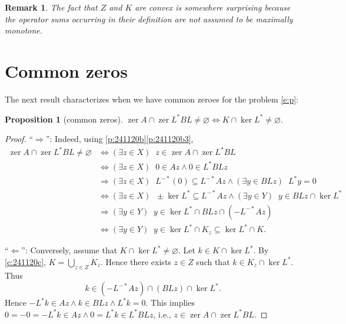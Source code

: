 \documentclass{article}
\providecommand{\siff}{\Leftrightarrow}
\newcommand{\zer}{\ensuremath{\operatorname{zer}}}
\newtheorem{proposition}[theorem]{Proposition}
\newtheorem{remark}[theorem]{Remark}
\begin{document}
\begin{remark} 
\label{r:241211a}
The fact that $Z$ and $K$ are convex is somewhere surprising 
because the operator sums occurring in their definition are 
not assumed to be maximally monotone.
\end{remark}


\section{Common zeros}

\label{s:commonzeros}



The next result characterizes when we have common zeroes for the problem 
\cref{e:p}:


\begin{proposition}[common zeros]\label{prop:commonzeros}
$\zer A\cap \zer L^*BL\neq \varnothing \siff K\cap \ker L^* \neq \varnothing$. 
\end{proposition}
\begin{proof} 
``$\Rightarrow$'':
Indeed, using \cref{p:241120b}\cref{p:241120b3}, 
\begin{subequations}
\begin{align}
\zer A\cap \zer L^*BL\neq \varnothing
&\siff 
(\exists z\in X)\;\; z\in\zer A\cap \zer L^*BL\\
&\siff 
(\exists z\in X)\;\; 
0\in Az\land 0\in L^*BLz\\
&\Rightarrow
(\exists z\in X)\;\; 
 L^{-*}(0)\subseteq L^{-*}Az 
\land (\exists y\in BLz)\;\; L^*y=0\\
&\siff 
(\exists z\in X)\;\; 
\pm\ker L^*\subseteq L^{-*}Az \land 
(\exists y\in Y)\;\; y\in BLz\cap \ker L^*\\
&\Rightarrow
(\exists y\in Y)\;\; y\in \ker L^* \cap BLz\cap (-L^{-*}Az)\\
&\siff 
(\exists y\in Y)\;\; y\in \ker L^* \cap K_z \subseteq \ker L^* \cap K. 
\end{align}
\end{subequations}

``$\Leftarrow$'': 
Conversely, assume that $K\cap \ker L^*\neq \varnothing$. 
Let $k\in K\cap \ker L^*$. 
By \cref{c:241120c}, $K=\bigcup_{z\in Z} K_z$. 
Hence there exists $z\in Z$ 
such that $k\in K_z\cap \ker L^*$. 
Thus
\begin{equation}
k \in (-L^{-*}Az) \cap (BLz) \cap \ker L^*. 
\end{equation}
Hence 
$-L^*k \in Az \land k \in BLz \land L^*k = 0$. 
This implies $0 = -0 = -L^*k \in Az \land 0 = L^*k \in L^*BLz$, 
i.e., $z\in \zer A \cap \zer L^*BL$. 
\end{proof}
\end{document}

